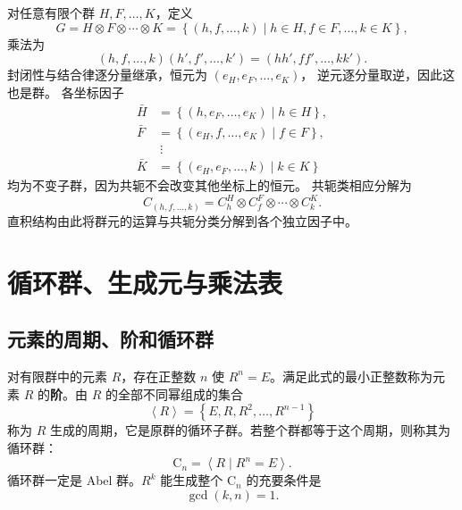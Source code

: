 对任意有限个群 $H,F,\ldots,K$，定义
\begin{equation}
G=H\otimes F\otimes\cdots\otimes K
=\left\{\left(h,f,\ldots,k\right)\mid h\in H,f\in F,\ldots,k\in K\right\},
\end{equation}
乘法为
\begin{equation}
\left(h,f,\ldots,k\right)\left(h',f',\ldots,k'\right)=\left(hh',ff',\ldots,kk'\right).
\end{equation}
封闭性与结合律逐分量继承，恒元为 $\left(e_H,e_F,\ldots,e_K\right)$，
逆元逐分量取逆，因此这也是群。
各坐标因子
\begin{align}
\bar H&=\left\{\left(h,e_F,\ldots,e_K\right)\mid h\in H\right\},\\
\bar F&=\left\{\left(e_H,f,\ldots,e_K\right)\mid f\in F\right\},\\
&\ \vdots\\
\bar K&=\left\{\left(e_H,e_F,\ldots,k\right)\mid k\in K\right\}
\end{align}
均为不变子群，因为共轭不会改变其他坐标上的恒元。
共轭类相应分解为
\begin{equation}
C_{\left(h,f,\ldots,k\right)}=C_h^H\otimes C_f^F\otimes\cdots\otimes C_k^K.
\end{equation}
直积结构由此将群元的运算与共轭分类分解到各个独立因子中。

\section{循环群、生成元与乘法表}
\subsection{元素的周期、阶和循环群}
对有限群中的元素 $R$，存在正整数 $n$ 使 $R^n=E$。满足此式的最小正整数称为元素 $R$ 的\textbf{阶}。由 $R$ 的全部不同幂组成的集合
\begin{equation}
\left\langle R\right\rangle=\left\{E,R,R^2,\ldots,R^{n-1}\right\}
\end{equation}
称为 $R$ 生成的周期，它是原群的循环子群。若整个群都等于这个周期，则称其为循环群：
\begin{equation}
\mathrm{C}_n=\left\langle R\mid R^n=E\right\rangle.
\end{equation}
循环群一定是 Abel 群。$R^k$ 能生成整个 $\mathrm{C}_n$ 的充要条件是
\begin{equation}
\gcd\left(k,n\right)=1.
\end{equation}

